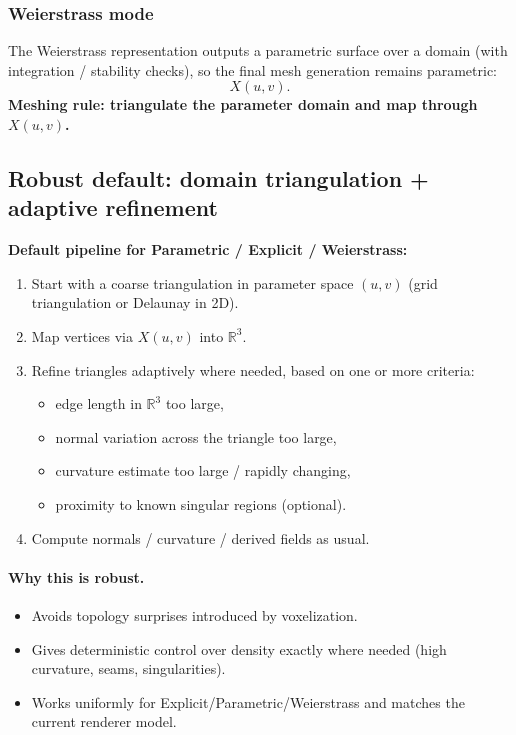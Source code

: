 \documentclass[12pt,a4paper]{article}
\newcommand{\R}{\mathbb{R}}
\theoremstyle{plain}
\theoremstyle{definition}
\begin{document}
		\subsubsection*{Weierstrass mode}
	The Weierstrass representation outputs a parametric surface over a domain (with integration / stability checks),
	so the final mesh generation remains parametric:
	\[
	X(u,v).
	\]
	\textbf{Meshing rule: triangulate the parameter domain and map through $X(u,v)$.}
	
	\subsection{Robust default: domain triangulation + adaptive refinement}
	\textbf{Default pipeline for Parametric / Explicit / Weierstrass:}
	\begin{enumerate}[label=\arabic*)]
		\item Start with a coarse triangulation in parameter space $(u,v)$
		(grid triangulation or Delaunay in 2D).
		\item Map vertices via $X(u,v)$ into $\R^3$.
		\item Refine triangles adaptively where needed, based on one or more criteria:
		\begin{itemize}
			\item edge length in $\R^3$ too large,
			\item normal variation across the triangle too large,
			\item curvature estimate too large / rapidly changing,
			\item proximity to known singular regions (optional).
		\end{itemize}
		\item Compute normals / curvature / derived fields as usual.
	\end{enumerate}
	
	\paragraph{Why this is robust.}
	\begin{itemize}
		\item Avoids topology surprises introduced by voxelization.
		\item Gives deterministic control over density exactly where needed (high curvature, seams, singularities).
		\item Works uniformly for Explicit/Parametric/Weierstrass and matches the current renderer model.
	\end{itemize}
	
\end{document}
